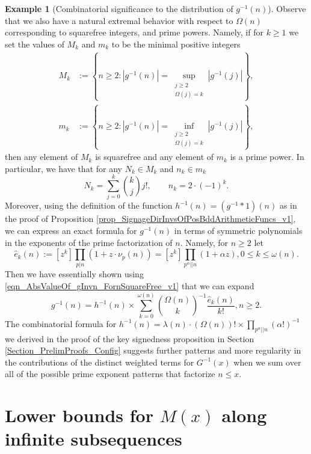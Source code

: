 \documentclass[11pt,reqno,a4letter]{article}
\numberwithin{figure}{section}
\numberwithin{table}{section}
\theoremstyle{plain}
\numberwithin{theorem}{section}
\theoremstyle{definition}
\newtheorem{example}[theorem]{Example}
\begin{document}
\begin{example}[Combinatorial significance to the distribution of $g^{-1}(n)$] 
Observe that we also have a natural extremal behavior with respect to $\Omega(n)$ 
corresponding to squarefree integers, and prime powers. Namely, if for $k \geq 1$ we set the 
values of $M_k$ and $m_k$ to be the minimal positive integers 
\begin{align*} 
M_k & := \left\{n \geq 2: |g^{-1}(n)| = \underset{{\substack{j \geq 2 \\ \Omega(j) = k}}}{\operatorname{sup}} 
     |g^{-1}(j)|\right\}, \\  
m_k & := \left\{n \geq 2: |g^{-1}(n)| = \underset{{\substack{j \geq 2 \\ \Omega(j) = k}}}{\operatorname{inf}} 
     |g^{-1}(j)|\right\}, 
\end{align*} 
then any element of $M_k$ is squarefree and any element of $m_k$ is a prime power. 
In particular, we have that for any $N_k \in M_k$ and $n_k \in m_k$
\[
N_k = \sum_{j=0}^{k} \binom{k}{j} j!, \qquad n_k = 2 \cdot (-1)^{k}. 
\]
Moreover, using the definition of the function $h^{-1}(n) = (g^{-1} \ast 1)(n)$ as in the proof of 
Proposition \ref{prop_SignageDirInvsOfPosBddArithmeticFuncs_v1}, we can express 
an exact formula for $g^{-1}(n)$ in terms of symmetric polynomials in the 
exponents of the prime factorization of $n$. 
Namely, for $n \geq 2$ let 
\[
\widehat{e}_k(n) := [z^k] \prod_{p|n} (1 + z \cdot \nu_p(n)) = [z^k] \prod_{p^{\alpha} || n} (1 + \alpha z), 
     0 \leq k \leq \omega(n). 
\]
Then we have essentially shown using \eqref{eqn_AbsValueOf_gInvn_FornSquareFree_v1} that we can expand 
\[
g^{-1}(n) = h^{-1}(n) \times \sum_{k=0}^{\omega(n)} \binom{\Omega(n)}{k}^{-1} 
     \frac{\widehat{e}_k(n)}{k!}, n \geq 2. 
\]
The combinatorial formula for 
$h^{-1}(n) = \lambda(n) \cdot (\Omega(n))! \times \prod_{p^{\alpha} || n} (\alpha !)^{-1}$ 
we derived in the proof of the key signedness proposition in 
Section \ref{Section_PrelimProofs_Config} 
suggests further patterns and more regularity in the contributions of the distinct weighted 
terms for $G^{-1}(x)$ when we sum over all of the possible prime exponent patterns that factorize 
$n \leq x$. 
\end{example} 

\newpage
\section{Lower bounds for $M(x)$ along infinite subsequences} 
\label{Section_KeyApplications} 
\end{document}
